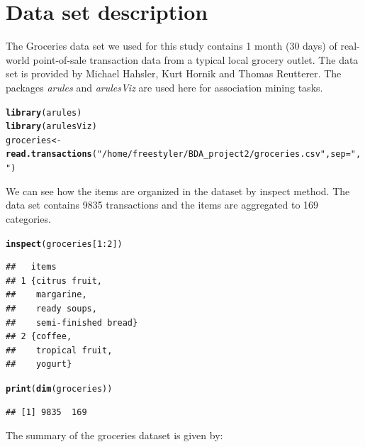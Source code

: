 \documentclass{article}\usepackage[]{graphicx}\usepackage[]{color}
\makeatletter
\newcommand{\hlnum}[1]{\textcolor[rgb]{0.686,0.059,0.569}{#1}}%
\newcommand{\hlstr}[1]{\textcolor[rgb]{0.192,0.494,0.8}{#1}}%
\newcommand{\hlopt}[1]{\textcolor[rgb]{0,0,0}{#1}}%
\newcommand{\hlstd}[1]{\textcolor[rgb]{0.345,0.345,0.345}{#1}}%
\newcommand{\hlkwb}[1]{\textcolor[rgb]{0.69,0.353,0.396}{#1}}%
\newcommand{\hlkwc}[1]{\textcolor[rgb]{0.333,0.667,0.333}{#1}}%
\newcommand{\hlkwd}[1]{\textcolor[rgb]{0.737,0.353,0.396}{\textbf{#1}}}%
\newenvironment{kframe}{%
 \def\at@end@of@kframe{}%
 \ifinner\ifhmode%
  \def\at@end@of@kframe{\end{minipage}}%
  \begin{minipage}{\columnwidth}%
 \fi\fi%
 \def\FrameCommand##1{\hskip\@totalleftmargin \hskip-\fboxsep
 \colorbox{shadecolor}{##1}\hskip-\fboxsep
     \hskip-\linewidth \hskip-\@totalleftmargin \hskip\columnwidth}%
 \MakeFramed {\advance\hsize-\width
   \@totalleftmargin\z@ \linewidth\hsize
   \@setminipage}}%
 {\par\unskip\endMakeFramed%
 \at@end@of@kframe}
\newenvironment{knitrout}{}{} %
\makeatother
\begin{document}
\section{Data set description}\hspace{0.9cm}The Groceries data set we used for this study contains 1 month (30 days) of real-world point-of-sale transaction data from a typical local grocery outlet. The data set is provided by Michael Hahsler, Kurt Hornik and Thomas Reutterer\cite{[3]}. The packages \textit{arules} and \textit{arulesViz} are used here for association mining tasks.\\
\begin{knitrout}
\color{fgcolor}\begin{kframe}
\begin{alltt}
\hlkwd{library}\hlstd{(arules)}
\hlkwd{library}\hlstd{(arulesViz)}
\hlstd{groceries} \hlkwb{<-} \hlkwd{read.transactions}\hlstd{(}\hlstr{"/home/freestyler/BDA_project2/groceries.csv"}\hlstd{,} \hlkwc{sep} \hlstd{=} \hlstr{","}\hlstd{)}
\end{alltt}
\end{kframe}
\end{knitrout}
\par We can see how the items are organized in the dataset by inspect method. The data set contains 9835 transactions and the items are aggregated to 169 categories. \\
\begin{knitrout}
\color{fgcolor}\begin{kframe}
\begin{alltt}
\hlkwd{inspect}\hlstd{(groceries[}\hlnum{1}\hlopt{:}\hlnum{2}\hlstd{])}
\end{alltt}
\begin{verbatim}
##   items                
## 1 {citrus fruit,       
##    margarine,          
##    ready soups,        
##    semi-finished bread}
## 2 {coffee,             
##    tropical fruit,     
##    yogurt}
\end{verbatim}
\begin{alltt}
\hlkwd{print}\hlstd{(}\hlkwd{dim}\hlstd{(groceries))}
\end{alltt}
\begin{verbatim}
## [1] 9835  169
\end{verbatim}
\end{kframe}
\end{knitrout}
The summary of the groceries dataset is given by:
\end{document}
